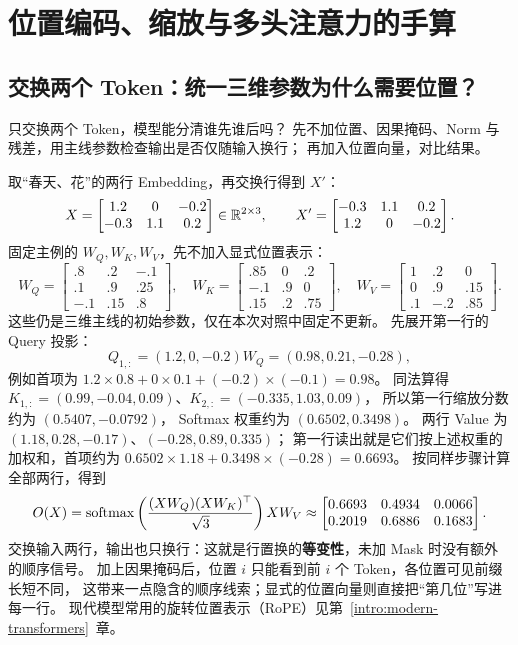 \chapterrule
\section{位置编码、缩放与多头注意力的手算}
\label{intro:position-multihead}

\begingroup
\setlength{\parskip}{2pt}
\setlength{\abovedisplayskip}{4pt}
\setlength{\belowdisplayskip}{4pt}
\setlength{\abovedisplayshortskip}{2pt}
\setlength{\belowdisplayshortskip}{2pt}
\subsection{交换两个 Token：统一三维参数为什么需要位置？}

只交换两个 Token，模型能分清谁先谁后吗？
先不加位置、因果掩码、Norm 与残差，用主线参数检查输出是否仅随输入换行；
再加入位置向量，对比结果。

取“春天、花”的两行 Embedding，再交换行得到 $X' $：
\[
X=\begin{bmatrix}1.2&0&-0.2\\-0.3&1.1&0.2\end{bmatrix}
\in\mathbb{R}^{2\times3},\qquad
X'=\begin{bmatrix}-0.3&1.1&0.2\\1.2&0&-0.2\end{bmatrix}.
\]
固定主例的 $W_Q,W_K,W_V$，先不加入显式位置表示：
\[
W_Q=\begin{bmatrix}.8&.2&-.1\\.1&.9&.25\\-.1&.15&.8\end{bmatrix},\quad
W_K=\begin{bmatrix}.85&0&.2\\-.1&.9&0\\.15&.2&.75\end{bmatrix},\quad
W_V=\begin{bmatrix}1&.2&0\\0&.9&.15\\.1&-.2&.85\end{bmatrix}.
\]
这些仍是三维主线的初始参数，仅在本次对照中固定不更新。
先展开第一行的 Query 投影：
\[
Q_{1,:}=(1.2,0,-0.2)W_Q=(0.98,0.21,-0.28),
\]
例如首项为 $1.2\times0.8+0\times0.1+(-0.2)\times(-0.1)=0.98$。
同法算得 $K_{1,:}=(0.99,-0.04,0.09)$、$K_{2,:}=(-0.335,1.03,0.09)$，
所以第一行缩放分数约为 $(0.5407,-0.0792)$，
Softmax 权重约为 $(0.6502,0.3498)$。
两行 Value 为 $(1.18,0.28,-0.17)$、$(-0.28,0.89,0.335)$；
第一行读出就是它们按上述权重的加权和，首项约为
$0.6502\times1.18+0.3498\times(-0.28)=0.6693$。
按同样步骤计算全部两行，得到
\[
O(X)=\operatorname{softmax}\left(\frac{(XW_Q)(XW_K)^\top}{\sqrt3}\right)XW_V
\approx\begin{bmatrix}
0.6693&0.4934&0.0066\\0.2019&0.6886&0.1683
\end{bmatrix}.
\]
交换输入两行，输出也只换行：这就是行置换的\textbf{等变性}，未加 Mask 时没有额外的顺序信号。
加上因果掩码后，位置 $i$ 只能看到前 $i$ 个 Token，各位置可见前缀长短不同，
这带来一点隐含的顺序线索；显式的位置向量则直接把“第几位”写进每一行。
现代模型常用的旋转位置表示（RoPE）见第~\ref*{intro:modern-transformers}~章。

